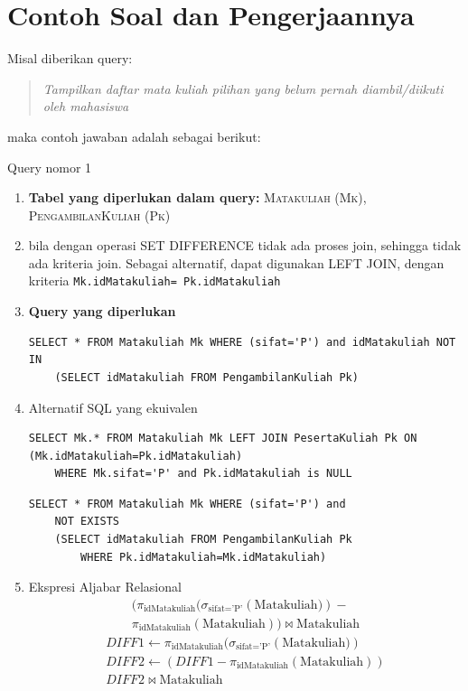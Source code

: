 \section{Contoh Soal dan Pengerjaannya}
Misal diberikan query:
\begin{tcolorbox}{}
  \begin{quote}
    \textit{Tampilkan daftar mata kuliah pilihan yang belum pernah diambil/diikuti oleh mahasiswa}
\end{quote}  
\end{tcolorbox}
maka contoh jawaban adalah sebagai berikut:
\begin{infobox}{Query nomor 1}
    \begin{enumerate}
        \itemsep0em \small
         \item \textbf{Tabel yang diperlukan dalam query:} \textsc{Matakuliah (Mk), PengambilanKuliah (Pk)}
         \item bila dengan operasi SET DIFFERENCE tidak ada proses join, sehingga tidak ada kriteria join. Sebagai alternatif, dapat digunakan LEFT JOIN, dengan kriteria \texttt{Mk.idMatakuliah= Pk.idMatakuliah} 
         \item \textbf{Query yang diperlukan} 
         \begin{lstlisting}[caption= pendekatan SET DIFFERENCE]
SELECT * FROM Matakuliah Mk WHERE (sifat='P') and idMatakuliah NOT IN 
    (SELECT idMatakuliah FROM PengambilanKuliah Pk)       
         \end{lstlisting}
         \item Alternatif SQL yang ekuivalen
         \begin{lstlisting}[caption=dengan LEFT JOIN]
SELECT Mk.* FROM Matakuliah Mk LEFT JOIN PesertaKuliah Pk ON (Mk.idMatakuliah=Pk.idMatakuliah) 
    WHERE Mk.sifat='P' and Pk.idMatakuliah is NULL
         \end{lstlisting}
      \begin{lstlisting}[caption=dengan EXISTS]
SELECT * FROM Matakuliah Mk WHERE (sifat='P') and 
    NOT EXISTS
    (SELECT idMatakuliah FROM PengambilanKuliah Pk 
        WHERE Pk.idMatakuliah=Mk.idMatakuliah)       
         \end{lstlisting}  
 \item Ekspresi Aljabar Relasional
 {\large
 \[
\begin{array}{c}
(\pi_{\text{idMatakuliah}}(\sigma_{\text{sifat='P'}}\left(\text{Matakuliah}) \right) - \\ \pi_{\text{idMatakuliah}}\left(\text{Matakuliah}\right))   \bowtie \text{Matakuliah}
\end{array}
 \]
}
{\large
 \[
 \begin{array}{c}
DIFF1 \leftarrow \pi_{\text{idMatakuliah}}(\sigma_{\text{sifat='P'}}\left(\text{Matakuliah}) \right)\\
 DIFF2 \leftarrow (DIFF1 - \pi_{\text{idMatakuliah}}\left(\text{Matakuliah}\right))  \\
DIFF2 \bowtie \text{Matakuliah}
 \end{array}
 \]
 }
    \end{enumerate}
\end{infobox}